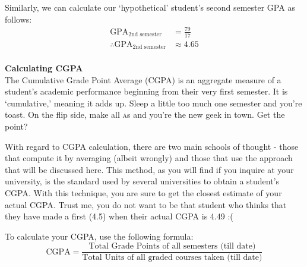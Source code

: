 \documentclass[letter]{article}
\begin{document}
\begin{table}[h]
	\centering
	\label{tab:second}
\end{table}

Similarly, we can calculate our `hypothetical' student's second semester GPA as follows:
\begin{align*}
	\text{GPA}_{\text{2nd semester}}            & = \frac{79}{17} \\
	\therefore \text{GPA}_{\text{2nd semester}} & \approx 4.65    \\
\end{align*}

\sffamily
\textbf{Calculating CGPA}\\
\normalfont
The Cumulative Grade Point Average (CGPA) is an aggregate measure of a student's academic performance beginning from their very first semester. It is `cumulative,' meaning it adds up. Sleep a little too much one semester and you're toast. On the flip side, make all \textsc{a}s and you're the new geek in town. Get the point?

With regard to CGPA calculation, there are two main schools of thought - those that compute it by averaging (albeit wrongly) and those that use the approach that will be discussed here. This method, as you will find if you inquire at your university, is the standard used by several universities to obtain a student's CGPA. With this technique, you are sure to get the closest estimate of your actual CGPA. Trust me, you do not want to be that student who thinks that they have made a first (4.5) when their actual CGPA is 4.49 :(

To calculate your CGPA, use the following formula:
\begin{equation}
	\text{CGPA} = \frac{\text{Total Grade Points of all semesters (till date)}}{\text{Total Units of all graded courses taken (till date)}}
\end{equation}
\end{document}
